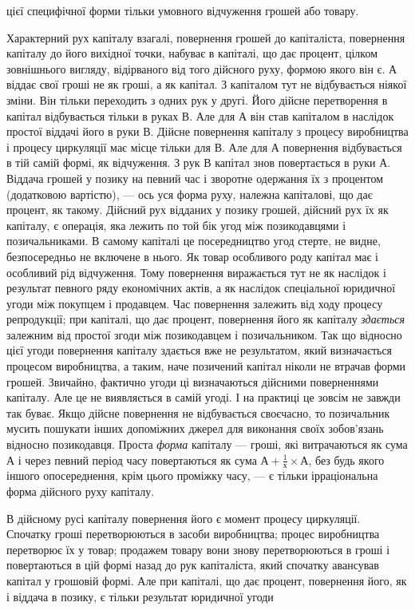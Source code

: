\parcont{}  %
цієї специфічної форми тільки умовного відчуження грошей
або товару.

Характерний рух капіталу взагалі, повернення грошей до
капіталіста, повернення капіталу до його вихідної точки, набуває
в капіталі, що дає процент, цілком зовнішнього вигляду,
відірваного від того дійсного руху, формою якого він є. $А$ віддає
свої гроші не як гроші, а як капітал. З капіталом тут не
відбувається ніякої зміни. Він тільки переходить з одних рук
у другі. Його дійсне перетворення в капітал відбувається тільки
в руках $В$. Але для $А$ він став капіталом в наслідок простої
віддачі його в руки $В$. Дійсне повернення капіталу з процесу
виробництва і процесу циркуляції має місце тільки для $В$.
Але для $А$ повернення відбувається в тій самій формі, як
відчуження. З рук $В$ капітал знов повертається в руки $А$. Віддача
грошей у позику на певний час і зворотне одержання їх
з процентом (додатковою вартістю), — ось уся форма руху, належна
капіталові, що дає процент, як такому. Дійсний рух відданих
у позику грошей, дійсний рух їх як капіталу, є операція,
яка лежить по той бік угод між позикодавцями і позичальниками.
В самому капіталі це посередництво угод стерте, не видне, безпосередньо
не включене в нього. Як товар особливого роду
капітал має і особливий рід відчуження. Тому повернення виражається
тут не як наслідок і результат певного ряду економічних
актів, а як наслідок спеціальної юридичної угоди між
покупцем і продавцем. Час повернення залежить від ходу процесу
репродукції; при капіталі, що дає процент, повернення
його як капіталу \emph{здається} залежним від простої згоди між позикодавцем
і позичальником. Так що відносно цієї угоди повернення
капіталу здається вже не результатом, який визначається процесом
виробництва, а таким, наче позичений капітал ніколи не
втрачав форми грошей. Звичайно, фактично угоди ці визначаються
дійсними поверненнями капіталу. Але це не виявляється
в самій угоді. І на практиці це зовсім не завжди так буває.
Якщо дійсне повернення не відбувається своєчасно, то позичальник
мусить пошукати інших допоміжних джерел для виконання
своїх зобов’язань відносно позикодавця. Проста \emph{форма} капіталу
— гроші, які витрачаються як сума А і через певний період
часу повертаються як сума $А + \frac{1}{х} × А$, без будь якого іншого опосереднення,
крім цього проміжку часу, — є тільки ірраціональна
форма дійсного руху капіталу.

В дійсному русі капіталу повернення його є момент процесу
циркуляції. Спочатку гроші перетворюються в засоби виробництва;
процес виробництва перетворює їх у товар; продажем товару
вони знову перетворюються в гроші і повертаються в цій формі
назад до рук капіталіста, який спочатку авансував капітал у грошовій
формі. Але при капіталі, що дає процент, повернення
його, як і віддача в позику, є тільки результат юридичної угоди
\parbreak{}  %
